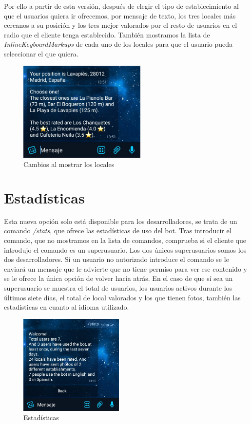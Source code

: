 \documentclass[oneside]{memoir}
\begin{document}
Por ello a partir de esta versión, después de elegir el tipo de establecimiento al que el usuarios quiera ir ofrecemos, por mensaje de texto, los tres locales más cercanos a su posición y los tres mejor valorados por el resto de usuarios en el radio que el cliente tenga establecido. También mostramos la lista  de \textit{InlineKeyboardMarkups} de cada uno de los locales para que el usuario pueda seleccionar el que quiera.

\begin{figure}[h!]
  \centering
  \includegraphics[height=50mm]{muestraLocales.jpg}
  \caption{Cambios al mostrar los locales}
  \label{fig:muestraLocales}
\end{figure}

\section{Estadísticas}
Esta nueva opción solo está disponible para los desarrolladores, se trata de un comando \textit{/stats}, que ofrece las estadísticas de uso del bot. Tras introducir el comando, que no mostramos en la lista de comandos, comprueba si el cliente que introdujo el comando es un superusuario. Los dos únicos superusuarios somos los dos desarrolladores. Si un usuario no autorizado introduce el comando se le enviará un mensaje que le advierte que no tiene permiso para ver ese contenido y se le ofrece la única opción de volver hacia atrás. En el caso de que sí sea un superusuario se muestra el total de usuarios, los usuarios activos durante los últimos siete días, el total de local valorados y los que tienen fotos, también las estadísticas en cuanto al idioma utilizado.

\begin{figure}[h!]
  \centering
  \includegraphics[height=50mm]{stats.jpg}
  \caption{Estadísticas}
  \label{fig:stats}
\end{figure}
\end{document}
